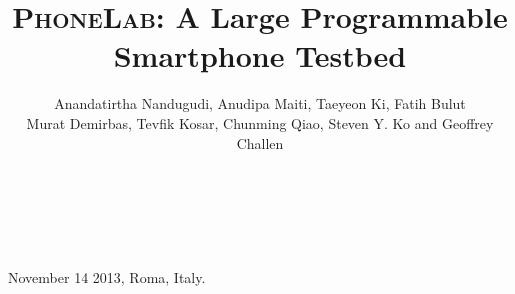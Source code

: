 


 {November 14 2013, Roma, Italy.}
\date{}

\title{\textsc{\LARGE PhoneLab}: A Large Programmable Smartphone Testbed}


\author{
\alignauthor
Anandatirtha Nandugudi, Anudipa Maiti, Taeyeon Ki, Fatih Bulut\\
Murat Demirbas, Tevfik Kosar, Chunming Qiao, Steven Y. Ko and Geoffrey Challen\\[0.06in]
\\
\\[0.06in]
\\
}

\maketitle








\balance
{\footnotesize


}


